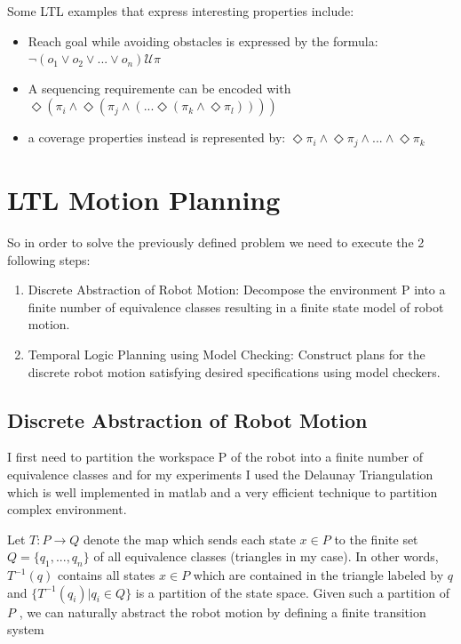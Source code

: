 \documentclass[conference,12pt]{IEEEtran}
\begin{document}
Some LTL examples that express interesting properties include:

\begin{itemize}
\item Reach goal while avoiding obstacles is expressed by the formula: $\neg(o_1 \vee o_2 \vee ... \vee o_n) \mathcal{U} \pi$
\item A sequencing requiremente can be encoded with $\Diamond( \pi_i \wedge \Diamond ( \pi_j \wedge ( ... \Diamond ( \pi_k \wedge \Diamond \pi_l) )))$
\item a coverage properties instead is represented by: $\Diamond \pi_i \wedge \Diamond \pi_j \wedge ... \wedge \Diamond \pi_k$
\end{itemize}

\section{LTL Motion Planning}

So in order to solve the previously defined problem we need to execute the 2 following steps:

\begin{enumerate}
\item Discrete Abstraction of Robot Motion: Decompose the environment P into a finite number of equivalence classes resulting in a finite state model of robot motion.
\item Temporal Logic Planning using Model Checking: Construct plans for the discrete robot motion satisfying desired specifications using model checkers.
\end{enumerate}

\subsection{Discrete Abstraction of Robot Motion}

I first need to partition the workspace P of the robot into a finite number of equivalence classes and for my experiments I used the Delaunay Triangulation which is well implemented in matlab and a very efficient technique to partition complex environment.

Let $T : P \rightarrow Q$ denote the map which sends each state $x \in P$ to the finite set $Q = \{q_1 , . . . , q_n \}$ of all equivalence classes (triangles in my case). In other words, $T^{-1}(q)$ contains all states $x \in P$ which are contained in the triangle labeled by $q$ and $\{T^{-1}(q_i) | q_i \in Q\}$ is a partition of the state space. Given such a partition of $P$ , we can naturally abstract the robot motion by defining a finite transition system
\end{document}
